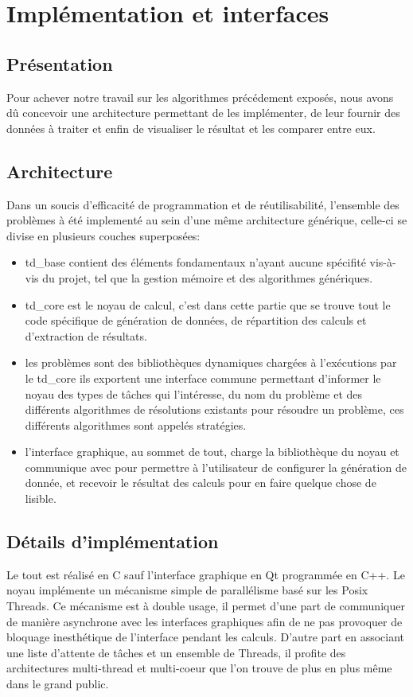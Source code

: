 \chapter{Implémentation et interfaces}
\section{Présentation}
Pour achever notre travail sur les algorithmes précédement exposés, nous avons
dû concevoir une architecture permettant de les implémenter, de leur fournir des
données à traiter et enfin de visualiser le résultat et les comparer entre eux.
\section{Architecture}
Dans un soucis d'efficacité de programmation et de réutilisabilité, l'ensemble
des problèmes à été implementé au sein d'une même architecture générique, celle-ci
se divise en plusieurs couches superposées:
\begin{itemize}
   \item td\_base contient des éléments fondamentaux n'ayant aucune spécifité
   vis-à-vis du projet, tel que la gestion mémoire et des algorithmes génériques.
   \item td\_core est le noyau de calcul, c'est dans cette partie que se trouve
   tout le code spécifique de génération de données, de répartition des calculs
   et d'extraction de résultats.
   \item les problèmes sont des bibliothèques dynamiques chargées à l'exécutions
   par le td\_core ils exportent une interface commune permettant d'informer le
   noyau des types de tâches qui l'intéresse, du nom du problème et des
   différents algorithmes de résolutions existants pour résoudre un problème,
   ces différents algorithmes sont appelés stratégies.
   \item l'interface graphique, au sommet de tout, charge la bibliothèque du 
   noyau et communique avec pour permettre à l'utilisateur de configurer la
   génération de donnée, et recevoir le résultat des calculs pour en faire
   quelque chose de lisible.
\end{itemize}
\section{Détails d'implémentation}
Le tout est réalisé en C sauf l'interface graphique en Qt programmée en C++.
Le noyau implémente un mécanisme simple de parallélisme basé sur les Posix Threads.
Ce mécanisme est à double usage, il permet d'une part de communiquer de manière
asynchrone avec les interfaces graphiques afin de ne pas provoquer de bloquage
inesthétique de l'interface pendant les calculs. D'autre part en associant une
liste d'attente de tâches et un ensemble de Threads, il profite des architectures
multi-thread et multi-coeur que l'on trouve de plus en plus même dans le grand
public.
